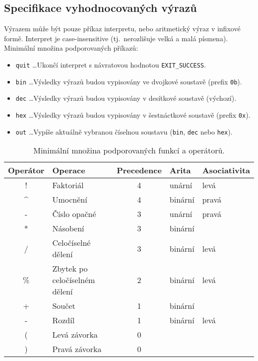 \subsection{Specifikace vyhodnocovaných výrazů}\label{subsection:expressions}
Výrazem může být pouze příkaz interpretu, nebo aritmetický výraz v infixové formě. Interpret
je case-insensitive (tj.~nerozlišuje velká a malá písmena). 
Minimální množina podporovaných příkazů: 
\begin{itemize}
    \item \verb|quit| \dots Ukončí interpret s návratovou hodnotou \verb|EXIT_SUCCESS|.
    \item \verb|bin| \dots Výsledky výrazů budou vypisovány ve dvojkové soustavě (prefix \verb|0b|).
    \item \verb|dec| \dots Výsledky výrazů budou vypisovány v desítkové soustavě (výchozí).
    \item \verb|hex| \dots Výsledky výrazů budou vypisovány v šestnáctkové soustavě (prefix \verb|0x|).
    \item \verb|out| \dots Vypíše aktuálně vybranou číselnou soustavu (\verb|bin|, \verb|dec| nebo \verb|hex|).
\end{itemize}
\begin{table}[h]
    \caption{Minimální množina podporovaných funkcí a operátorů.}\label{tab:function}
    \begin{tabular}{clcll}
    \hline
    \textbf{Operátor}  & \textbf{Operace}              & \textbf{Precedence} & \textbf{Arita} & \textbf{Asociativita} \\ \hline
    !                  & Faktoriál                     & 4                   & unární         & levá                  \\
    \textasciicircum{} & Umocnění                      & 4                   & binární        & pravá                 \\
    -                  & Číslo opačné                  & 3                   & unární         & pravá                 \\
    *                  & Násobení                      & 3                   & binární        &                       \\
    /                  & Celočíselné dělení            & 3                   & binární        & levá                  \\
    \%                 & Zbytek po celočíselném dělení & 2                   & binární        & levá                  \\
    +                  & Součet                        & 1                   & binární        &                       \\
    -                  & Rozdíl                        & 1                   & binární        & levá                  \\
    (                  & Levá závorka                  & 0                   &                &                       \\ 
    )                  & Pravá závorka                 & 0                   &                &                       \\ \hline
    \end{tabular}
\end{table}

